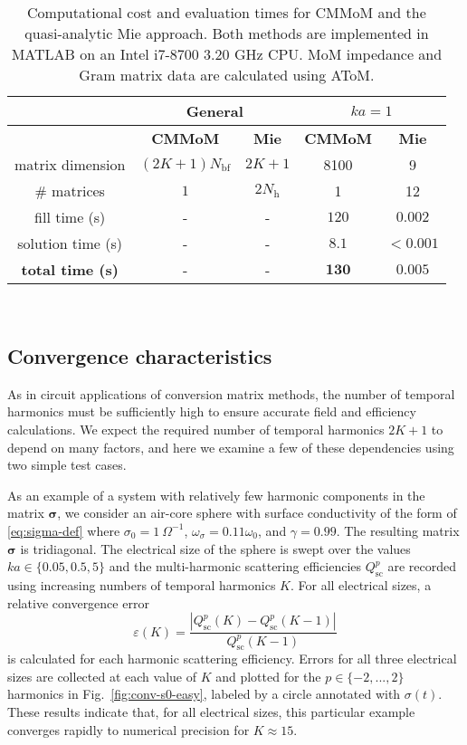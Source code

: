 \documentclass[article]{IEEEtran}
\newcommand{\T}[1]{\mathrm{#1}}
\newcommand{\V}[1]{\boldsymbol{#1}}
\begin{document}
\begin{table}[]
    \centering
    \caption{Computational cost and evaluation times for CMMoM and the quasi-analytic Mie approach.  Both methods are implemented in MATLAB on an Intel i7-8700 3.20 GHz CPU.  MoM impedance and Gram matrix data are calculated using AToM\cite{atom}.}
    
    \begin{tabular}{c|c|c|c|c}
        & \multicolumn{2}{c}{General} & \multicolumn{2}{|c}{$ka = 1$} \\\hline\hline
        & \textbf{CMMoM} & \textbf{Mie} & \textbf{CMMoM} & \textbf{Mie} \\
        \hline
        matrix dimension & $(2K+1)N_\T{bf}$&  $2K+1$ & 8100 & 9 \\
        \# matrices & $1$ & $2N_\T{h}$ & 1 & 12 \\\hline
        fill time (s)& - & - & $120$ & $0.002$ \\
        solution time (s) & - &- & $8.1$ & $<0.001$ \\\hline
        \textbf{total time (s)} & - &- & $\mathbf{130}$ & $\mathbf{0.005}$
    \end{tabular}
    ~\\
    \label{tab:my_label}
\end{table}

\subsection{Convergence characteristics}
As in circuit applications of conversion matrix methods, the number of temporal harmonics must be sufficiently high to ensure accurate field and efficiency calculations.  We expect the required number of temporal harmonics $2K+1$ to depend on many factors, and here we examine a few of these dependencies using two simple test cases.

As an example of a system with relatively few harmonic components in the matrix $\V{\sigma}$, we consider an air-core sphere with surface conductivity of the form of \eqref{eq:sigma-def} where $\sigma_0 = 1~\Omega^{-1}$, $\omega_\sigma = 0.11\omega_0$, and $\gamma = 0.99$. The resulting matrix  $\V{\sigma}$ is tridiagonal.  The electrical size of the sphere is swept over the values $ka\in\{0.05,0.5,5\}$ and the multi-harmonic scattering efficiencies $Q_\T{sc}^p$ are recorded using increasing numbers of temporal harmonics $K$.  For all electrical sizes, a relative convergence error 
\begin{equation}
    \varepsilon(K) = \frac{|Q_\T{sc}^p(K)-Q_\T{sc}^p(K-1)|}{Q_\T{sc}^p(K-1)}  
\end{equation}
is calculated for each harmonic scattering efficiency.  Errors for all three electrical sizes are collected at each value of $K$ and plotted for the $p\in\{-2,...,2\}$ harmonics in Fig.~\ref{fig:conv-s0-easy}, labeled by a circle annotated with $\sigma(t)$.  These results indicate that, for all electrical sizes, this particular example converges rapidly to numerical precision for $K\approx 15$.
\end{document}
